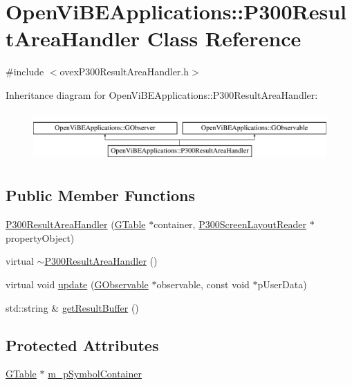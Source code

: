 \hypertarget{classOpenViBEApplications_1_1P300ResultAreaHandler}{
\section{OpenViBEApplications::P300ResultAreaHandler Class Reference}
\label{classOpenViBEApplications_1_1P300ResultAreaHandler}
}


{\ttfamily \#include $<$ovexP300ResultAreaHandler.h$>$}

Inheritance diagram for OpenViBEApplications::P300ResultAreaHandler:\begin{figure}[H]
\begin{center}
\leavevmode
\includegraphics[height=1.931034cm]{classOpenViBEApplications_1_1P300ResultAreaHandler}
\end{center}
\end{figure}
\subsection*{Public Member Functions}
\begin{DoxyCompactItemize}
\item 
\hyperlink{classOpenViBEApplications_1_1P300ResultAreaHandler_a1d01113c64c2a8b4e0705016460cf649}{P300ResultAreaHandler} (\hyperlink{classOpenViBEApplications_1_1GTable}{GTable} $\ast$container, \hyperlink{classOpenViBEApplications_1_1P300ScreenLayoutReader}{P300ScreenLayoutReader} $\ast$propertyObject)
\item 
virtual \hyperlink{classOpenViBEApplications_1_1P300ResultAreaHandler_aee1aec66976314140b214d359a6da77b}{$\sim$P300ResultAreaHandler} ()
\item 
virtual void \hyperlink{classOpenViBEApplications_1_1P300ResultAreaHandler_aecc8b12b90d04b738d5f141f3b79ed04}{update} (\hyperlink{classOpenViBEApplications_1_1GObservable}{GObservable} $\ast$observable, const void $\ast$pUserData)
\item 
std::string \& \hyperlink{classOpenViBEApplications_1_1P300ResultAreaHandler_abba46bb0a35c13761b0bc89d46d81496}{getResultBuffer} ()
\end{DoxyCompactItemize}
\subsection*{Protected Attributes}
\begin{DoxyCompactItemize}
\item 
\hyperlink{classOpenViBEApplications_1_1GTable}{GTable} $\ast$ \hyperlink{classOpenViBEApplications_1_1P300ResultAreaHandler_a86b51c35dbd8f18f8dfe9fe19bfaeffd}{m\_\-pSymbolContainer}
\end{DoxyCompactItemize}
